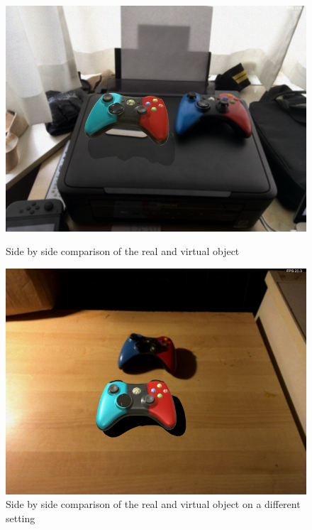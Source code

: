 \begin{figure}[H]
\centering
\includegraphics[width=1.0\textwidth]{Figures/res1.JPG}
\caption{Side by side comparison of the real and virtual object}
\includegraphics[width=1.0\textwidth]{Figures/rest5.JPG}
\caption{Side by side comparison of the real and virtual object on a different setting}
\end{figure}

